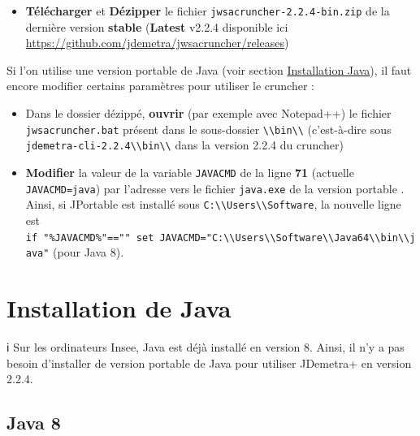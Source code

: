 \documentclass[
]{article}
\providecommand{\tightlist}{%
  \setlength{\itemsep}{0pt}\setlength{\parskip}{0pt}}
\begin{document}
\begin{itemize}
\tightlist
\item
  \textbf{Télécharger} et \textbf{Dézipper} le fichier
  \texttt{jwsacruncher-2.2.4-bin.zip} de la dernière version
  \textbf{stable} (\textbf{Latest} v2.2.4 disponible ici
  \textcolor{html_color}{\url{https://github.com/jdemetra/jwsacruncher/releases}})
\end{itemize}

Si l'on utilise une version portable de Java (voir section
\protect\hyperlink{install_java}{Installation Java}), il faut encore
modifier certains paramètres pour utiliser le cruncher :

\begin{itemize}
\tightlist
\item
  Dans le dossier dézippé, \textbf{ouvrir} (par exemple avec Notepad++)
  le fichier \texttt{jwsacruncher.bat} présent dans le sous-dossier
  \textcolor{windows_path_color}{\nolinkurl{\\bin\\}} (c'est-à-dire sous
  \textcolor{windows_path_color}{\nolinkurl{jdemetra-cli-2.2.4\\bin\\}}
  dans la version 2.2.4 du cruncher)
\item
  \textbf{Modifier} la valeur de la variable \texttt{JAVACMD} de la
  ligne \textbf{71} (actuelle \texttt{JAVACMD=java}) par l'adresse vers
  le fichier \texttt{java.exe} de la version portable . Ainsi, si
  JPortable est installé sous
  \textcolor{windows_path_color}{\nolinkurl{C:\\Users\\Software}}, la
  nouvelle ligne est
  \texttt{if\ "\%JAVACMD\%"==""\ set\ JAVACMD="C:\textbackslash{}\textbackslash{}Users\textbackslash{}\textbackslash{}Software\textbackslash{}\textbackslash{}Java64\textbackslash{}\textbackslash{}bin\textbackslash{}\textbackslash{}java"}
  (pour Java 8).
\end{itemize}

\hypertarget{install_java}{%
\section{Installation de Java}\label{install_java}}

ℹ️ Sur les ordinateurs Insee, Java est déjà installé en version 8.
Ainsi, il n'y a pas besoin d'installer de version portable de Java pour
utiliser JDemetra+ en version 2.2.4.

\hypertarget{java-8}{%
\subsection{Java 8}\label{java-8}}
\end{document}
